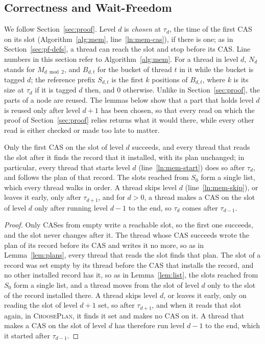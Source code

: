 \subsection{Correctness and Wait-Freedom}
\label{sec:mem-proof}

We follow Section~\ref{sec:proof}. Level $d$ is \emph{chosen} at $\tau_d$, the time of the first CAS on its slot (Algorithm~\ref{alg:mem}, line~\ref{ln:mem-cas}), if there is one; as in Section~\ref{sec:pf-defs}, a thread can reach the slot and stop before its CAS. Line numbers in this section refer to Algorithm~\ref{alg:mem}. For a thread in level $d$, $N_d$ stands for $M_{d \bmod 2}$, and $B_{d,t}$ for the bucket of thread $t$ in it while the bucket is tagged $d$; the reference prefix $S_{d,t}$ is the first $k$ positions of $B_{d,t}$, where $k$ is its size at $\tau_d$ if it is tagged $d$ then, and $0$ otherwise. Unlike in Section~\ref{sec:proof}, the parts of a node are reused. The lemmas below show that a part that holds level $d$ is reused only after level $d+1$ has been chosen, so that every read on which the proof of Section~\ref{sec:proof} relies returns what it would there, while every other read is either checked or made too late to matter.

\begin{lemma}[Slots]
\label{lem:mem-slots}
Only the first CAS on the slot of level $d$ succeeds, and every thread that reads the slot after it finds the record that it installed, with its plan unchanged; in particular, every thread that starts level $d$ (line~\ref{ln:mem-start}) does so after $\tau_d$, and follows the plan of that record. The slots reached from $S_0$ form a single list, which every thread walks in order. A thread skips level $d$ (line~\ref{ln:mem-skip}), or leaves it early, only after $\tau_{d+1}$, and for $d > 0$, a thread makes a CAS on the slot of level $d$ only after running level $d-1$ to the end, so $\tau_d$ comes after $\tau_{d-1}$.
\end{lemma}
\begin{proof}
Only CASes from empty write a reachable slot, so the first one succeeds, and the slot never changes after it. The thread whose CAS succeeds wrote the plan of its record before its CAS and writes it no more, so as in Lemma~\ref{lem:plans}, every thread that reads the slot finds that plan. The slot of a record was set empty by its thread before the CAS that installs the record, and no other installed record has it, so as in Lemma~\ref{lem:list}, the slots reached from $S_0$ form a single list, and a thread moves from the slot of level $d$ only to the slot of the record installed there. A thread skips level $d$, or leaves it early, only on reading the slot of level $d+1$ set, so after $\tau_{d+1}$, and when it reads that slot again, in \textsc{ChoosePlan}, it finds it set and makes no CAS on it. A thread that makes a CAS on the slot of level $d$ has therefore run level $d-1$ to the end, which it started after $\tau_{d-1}$.
\end{proof}

